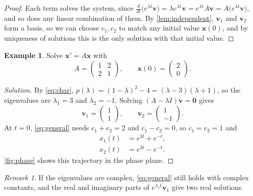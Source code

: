\documentclass[11pt,a4paper]{article}   %
\numberwithin{equation}{section}
\numberwithin{figure}{section}
\numberwithin{table}{section}
\theoremstyle{plain}                    %
\theoremstyle{definition}               %
\newtheorem{example}[theorem]{Example}
\theoremstyle{remark}                   %
\newtheorem{remark}[theorem]{Remark}
\newenvironment{solution}{\begin{proof}[Solution]}{\end{proof}}
\begin{document}
\begin{proof}
Each term solves the system, since
$\frac{d}{dt}\bigl(e^{\lambda t}\mathbf{v}\bigr) = \lambda e^{\lambda t}\mathbf{v}
= e^{\lambda t} A\mathbf{v} = A\bigl(e^{\lambda t}\mathbf{v}\bigr)$, and so does any linear
combination of them. By \cref{lem:independent}, $\mathbf{v}_1$ and $\mathbf{v}_2$ form a basis, so we can
choose $c_1, c_2$ to match any initial value $\mathbf{x}(0)$, and by uniqueness of solutions
this is the only solution with that initial value.
\end{proof}

\begin{example}\label{ex:saddle}
Solve $\mathbf{x}' = A\mathbf{x}$ with
\[
  A = \begin{pmatrix} 1 & 2 \\ 2 & 1 \end{pmatrix}, \qquad
  \mathbf{x}(0) = \begin{pmatrix} 2 \\ 0 \end{pmatrix}.
\]
\end{example}

\begin{solution}
By \cref{eq:char}, $p(\lambda) = (1 - \lambda)^2 - 4 = (\lambda - 3)(\lambda + 1)$, so the
eigenvalues are $\lambda_1 = 3$ and $\lambda_2 = -1$. Solving $(A - \lambda I)\mathbf{v} = \mathbf{0}$
gives
\[
  \mathbf{v}_1 = \begin{pmatrix} 1 \\ 1 \end{pmatrix}, \qquad
  \mathbf{v}_2 = \begin{pmatrix} 1 \\ -1 \end{pmatrix}.
\]
At $t = 0$, \cref{eq:general} needs $c_1 + c_2 = 2$ and $c_1 - c_2 = 0$, so $c_1 = c_2 = 1$ and
\begin{align*}
  x_1(t) &= e^{3t} + e^{-t}, \\
  x_2(t) &= e^{3t} - e^{-t}.
\end{align*}
\cref{fig:phase} shows this trajectory in the phase plane.
\end{solution}

\begin{remark}
If the eigenvalues are complex, \cref{eq:general} still holds with complex constants, and the real
and imaginary parts of $e^{\lambda_1 t}\mathbf{v}_1$ give two real solutions.
\end{remark}
\end{document}
